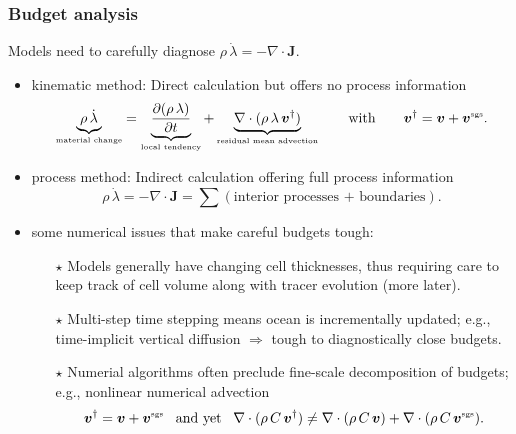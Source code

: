 \documentclass[10pt]{beamer}
\begin{document}
\begin{frame}
  \frametitle{Budget analysis}

\begin{center}
\color{red}
Models need to carefully diagnose $\rho \, \dot{\lambda} = -\nabla \cdot {\bm J}.$ 
\color{black}
\end{center}


\begin{itemize}

\item {\sc kinematic method}: Direct calculation but offers no process information 
\begin{equation}
  \underbrace{ \rho \, \dot{\lambda} }_{\mbox{\tiny material change}}
    = \underbrace{ \frac{\partial (\rho \, \lambda)}{\partial t}}_{\mbox{\tiny local tendency}}
    + \underbrace{  \nabla \cdot (\rho \, \lambda \, {\bm v}^{\dagger} ) }_{\mbox{\tiny residual mean advection}}
 \qquad  \mbox{with}  \qquad {\bm v}^{\dagger} = {\bm v} + {\bm v}^{\mbox{\tiny sgs}}. 
\end{equation}


\item {\sc process method}: Indirect calculation offering full process information
\begin{equation}
  \rho \, \dot{\lambda} = -\nabla \cdot {\bm J} = \sum (\mbox{interior processes + boundaries}).
\end{equation}

\item {\sc some numerical issues that make careful budgets tough}: 
\begin{itemize}
\footnotesize 

\item[$\star$] Models generally have changing cell thicknesses, thus
  requiring care to keep track of cell volume along with tracer
  evolution (more later).

\item[$\star$] Multi-step time stepping means ocean is incrementally
  updated; e.g., time-implicit vertical diffusion $\Longrightarrow$
  tough to diagnostically close budgets.

\item[$\star$] Numerial algorithms often preclude fine-scale
  decomposition of budgets; e.g., nonlinear numerical advection
\begin{equation}
   {\bm v}^{\dagger} = {\bm v} + {\bm v}^{\mbox{\tiny sgs}}   \; \; \;  \mbox{and yet} \; \; \; 
  \nabla \cdot ( \rho \, C \, {\bm v}^{\dagger}) \ne \nabla \cdot ( \rho \, C \, {\bm v}) + \nabla \cdot ( \rho \, C \, {\bm v}^{\mbox{\tiny sgs}}  ). 
\end{equation}
 

\end{itemize}

\end{itemize}


\end{frame}
\end{document}

